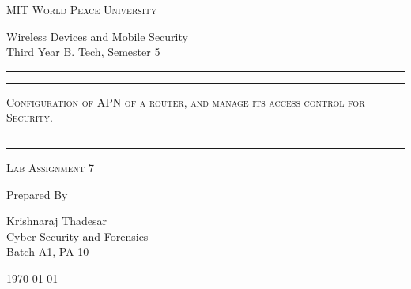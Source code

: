 \documentclass[11pt]{article}
\begin{document}
\begin{titlepage}
    \centering


    \huge\textsc{
        MIT World Peace University
    }\\

    \vspace{0.75\baselineskip} %

    \LARGE{
        Wireless Devices and Mobile Security\\
        Third Year B. Tech, Semester 5
    }

    \vfill %


    \rule{\textwidth}{1.6pt}\vspace*{-\baselineskip}\vspace*{2pt}
    \rule{\textwidth}{0.6pt}
    \vspace{0.75\baselineskip} %

    \huge{\textsc{
            Configuration of APN of a router, and manage its access control for Security.
        }} \\

    \vspace{0.5\baselineskip} %
    \rule{\textwidth}{0.6pt}\vspace*{-\baselineskip}\vspace*{2.8pt}
    \rule{\textwidth}{1.6pt}

    \vspace{1\baselineskip} %


    \LARGE\textsc{
        Lab Assignment 7
    } %
    \vfill


    Prepared By \vspace{0.5\baselineskip} %

    \Large{
        Krishnaraj Thadesar \\
        Cyber Security and Forensics\\
        Batch A1, PA 10
    }

    \vspace{0.5\baselineskip} %
    \today

\end{titlepage}
\end{document}
